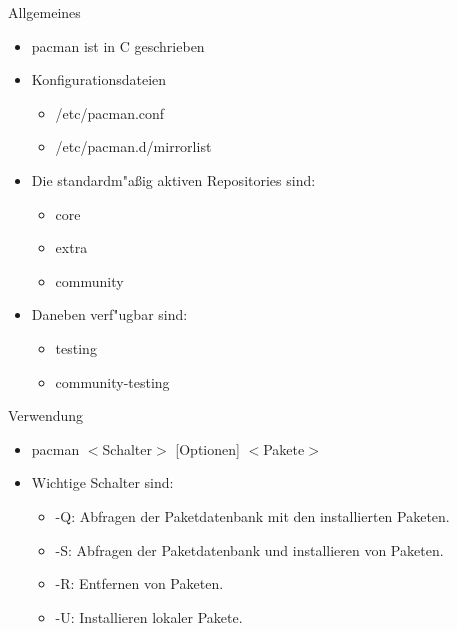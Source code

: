 
\begin{slide}{Allgemeines}
	\begin{itemize}
		\item{pacman ist in C geschrieben}
		\item{Konfigurationsdateien
			\begin{itemize}
				\item{/etc/pacman.conf}
				\item{/etc/pacman.d/mirrorlist}
			\end{itemize}
		}
		\item{Die standardm"{a}ßig aktiven Repositories sind:
			\begin{itemize}
				\item{core}
				\item{extra}
				\item{community}
			\end{itemize}
		}
		\item{Daneben verf"{u}gbar sind:
			\begin{itemize}
				\item{testing}
				\item{community-testing}
			\end{itemize}
		}
	\end{itemize}
\end{slide}

\begin{slide}{Verwendung}
	\begin{itemize}
		\item{pacman $<$Schalter$>$ [Optionen] $<$Pakete$>$}
		\item{Wichtige Schalter sind:
			\begin{itemize}
				\item{-Q: Abfragen der Paketdatenbank mit den installierten
					Paketen.}
				\item{-S: Abfragen der Paketdatenbank und installieren von
					Paketen.}
				\item{-R: Entfernen von Paketen.}
				\item{-U: Installieren lokaler Pakete.}
			\end{itemize}
		}
	\end{itemize}
\end{slide}

